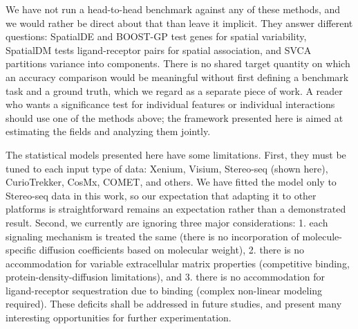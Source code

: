 \documentclass[10pt,letterpaper]{article}
\begin{document}
We have not run a head-to-head benchmark against any of these methods, and we would rather be direct about that than leave it implicit. They answer different questions: SpatialDE and BOOST-GP test genes for spatial variability, SpatialDM tests ligand-receptor pairs for spatial association, and SVCA partitions variance into components. There is no shared target quantity on which an accuracy comparison would be meaningful without first defining a benchmark task and a ground truth, which we regard as a separate piece of work. A reader who wants a significance test for individual features or individual interactions should use one of the methods above; the framework presented here is aimed at estimating the fields and analyzing them jointly.

The statistical models presented here have some limitations. First, they must be tuned to each input type of data: Xenium, Visium, Stereo-seq (shown here), CurioTrekker, CosMx, COMET, and others. We have fitted the model only to Stereo-seq data in this work, so our expectation that adapting it to other platforms is straightforward remains an expectation rather than a demonstrated result. Second, we currently are ignoring three major considerations: 1. each signaling mechanism is treated the same (there is no incorporation of molecule-specific diffusion coefficients based on molecular weight), 2. there is no accommodation for variable extracellular matrix properties (competitive binding, protein-density-diffusion limitations), and 3. there is no accommodation for ligand-receptor sequestration due to binding (complex non-linear modeling required). These deficits shall be addressed in future studies, and present many interesting opportunities for further experimentation.
\end{document}
